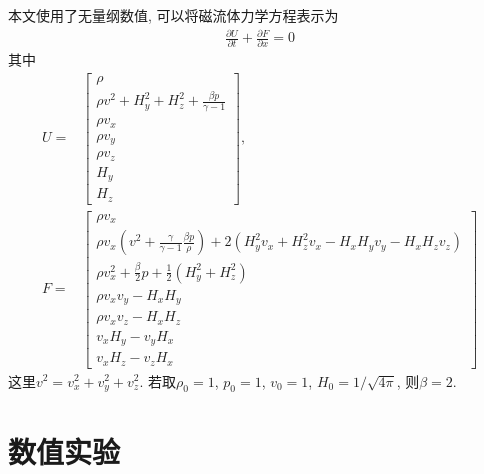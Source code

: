 \documentclass[10.5pt
]{article}
\begin{document}
本文使用了无量纲数值, 可以将磁流体力学方程表示为
\begin{align}
\frac{\partial U}{\partial t} + \frac{\partial F}{\partial x} = 0 \label{Eqn:MHD}
\end{align}
其中
\begin{align}
U = & \left[ \begin{array}{l}
\rho\\
\rho v^2 + H_y^2 + H_z^2 + \frac{\beta p}{\gamma -1}
\\
\rho v_x\\
\rho v_y\\
\rho v_z\\
H_y\\
H_z
\end{array} \right], \label{Eqn:U}\\
F = & \left[ \begin{array}{l}
\rho v_x\\
\rho v_x \left(v^2 + \frac{\gamma}{\gamma - 1} \frac{\beta p}{\rho} \right) + 2(H_y^2 v_x + H_z^2 v_x - H_x H_y v_y - H_x H_z v_z)
\\
\rho v_x^2 + \frac{\beta}{2} p + \frac{1}{2} (H_y^2 + H_z^2)\\
\rho v_x v_y - H_x H_y\\
\rho v_x v_z - H_x H_z\\
v_x H_y - v_y H_x\\
v_x H_z - v_z H_x
\end{array} \right] \label{Eqn:Flux}
\end{align}
这里$v^2 = v_x^2 + v_y^2 + v_z^2$. 若取$\rho_0 = 1$, $p_0 = 1$, $v_0 = 1$, $H_0 = 1/\sqrt{4\pi}$, 则$\beta = 2$.

\section{数值实验}
\end{document}
